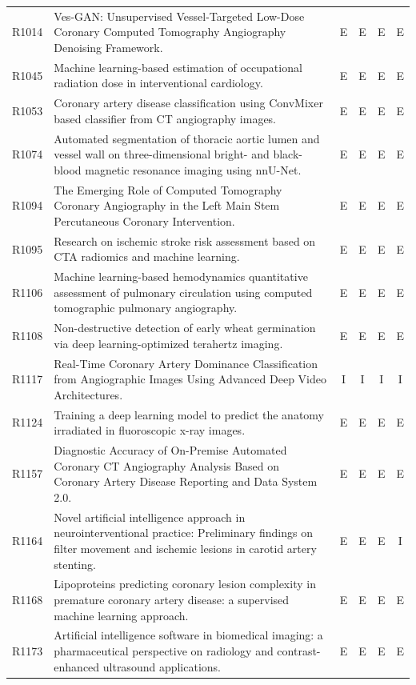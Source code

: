 \begin{longtable}{@{}l p{8.6cm} c c c c@{}}
R1014 & Ves-GAN: Unsupervised Vessel-Targeted Low-Dose Coronary Computed Tomography Angiography Denoising Framework. & E & E & E & E \\
R1045 & Machine learning-based estimation of occupational radiation dose in interventional cardiology. & E & E & E & E \\
R1053 & Coronary artery disease classification using ConvMixer based classifier from CT angiography images. & E & E & E & E \\
R1074 & Automated segmentation of thoracic aortic lumen and vessel wall on three-dimensional bright- and black-blood magnetic resonance imaging using nnU-Net. & E & E & E & E \\
R1094 & The Emerging Role of Computed Tomography Coronary Angiography in the Left Main Stem Percutaneous Coronary Intervention. & E & E & E & E \\
R1095 & Research on ischemic stroke risk assessment based on CTA radiomics and machine learning. & E & E & E & E \\
R1106 & Machine learning-based hemodynamics quantitative assessment of pulmonary circulation using computed tomographic pulmonary angiography. & E & E & E & E \\
R1108 & Non-destructive detection of early wheat germination via deep learning-optimized terahertz imaging. & E & E & E & E \\
R1117 & Real-Time Coronary Artery Dominance Classification from Angiographic Images Using Advanced Deep Video Architectures. & I & I & I & I \\
R1124 & Training a deep learning model to predict the anatomy irradiated in fluoroscopic x-ray images. & E & E & E & E \\
R1157 & Diagnostic Accuracy of On-Premise Automated Coronary CT Angiography Analysis Based on Coronary Artery Disease Reporting and Data System 2.0. & E & E & E & E \\
R1164 & Novel artificial intelligence approach in neurointerventional practice: Preliminary findings on filter movement and ischemic lesions in carotid artery stenting. & E & E & E & I \\
R1168 & Lipoproteins predicting coronary lesion complexity in premature coronary artery disease: a supervised machine learning approach. & E & E & E & E \\
R1173 & Artificial intelligence software in biomedical imaging: a pharmaceutical perspective on radiology and contrast-enhanced ultrasound applications. & E & E & E & E \\

\end{longtable}
